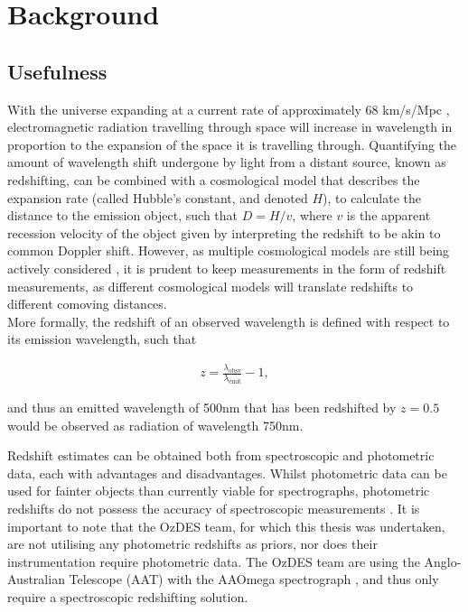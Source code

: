 \documentclass[titlesmallcaps, examinerscopy, copyrightpage]{uqthesis}
\begin{document}
\chapter{Background}
\label{ch:back}

\section{Usefulness}

With the universe expanding at a current rate of approximately 68 km/s/Mpc \cite{ade2013planck}, electromagnetic radiation travelling through space will increase in wavelength in proportion to the expansion of the space it is travelling through. Quantifying the amount of wavelength shift undergone by light from a distant source, known as redshifting, can be combined with a cosmological model that describes the expansion rate (called Hubble's constant, and denoted $H$), to calculate the distance to the emission object, such that $D = H/v$, where $v$ is the apparent recession velocity of the object given by interpreting the redshift to be akin to common Doppler shift. However, as multiple cosmological models are still being actively considered \cite{davis2007scrutinizing}, it is prudent to keep measurements in the form of redshift measurements, as different cosmological models will translate redshifts to different comoving distances.\\

More formally, the redshift of an observed wavelength is defined with respect to its emission wavelength, such that

\begin{align}
z = \frac{\lambda_{\text{obsv}}}{\lambda_{\text{emit}}} - 1,
\end{align}

and thus an emitted wavelength of 500nm that has been redshifted by $z = 0.5$ would be observed as radiation of wavelength 750nm.

Redshift estimates can be obtained both from spectroscopic and photometric data, each with advantages and disadvantages. Whilst photometric data can be used for fainter objects than currently viable for spectrographs, photometric redshifts do not possess the accuracy of spectroscopic measurements \cite{bolzonella2000photometric}. It is important to note that the OzDES team, for which this thesis was undertaken, are not utilising any photometric redshifts as priors, nor does their instrumentation require photometric data. The OzDES team are using the Anglo-Australian Telescope (AAT) with the AAOmega spectrograph \cite{d2014ozdes}, and thus only require a spectroscopic redshifting solution.
\end{document}
